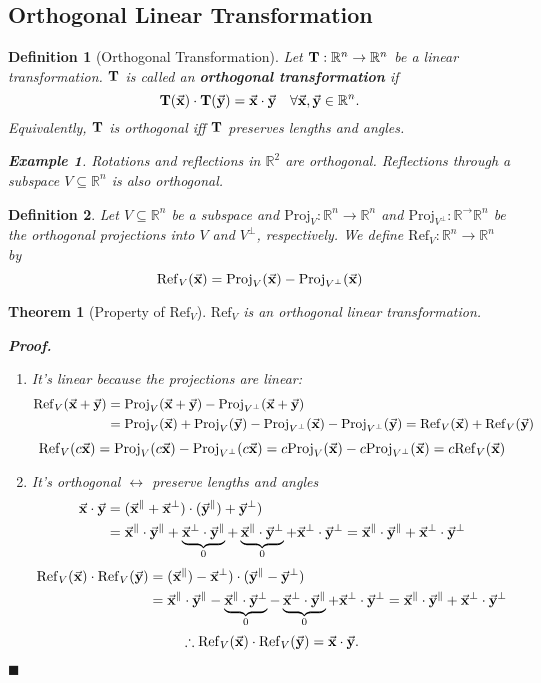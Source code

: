 \documentclass[12pt, a4paper]{article}
\newtheorem{thm}{Theorem}[subsection]
\newtheorem{df}{Definition}[subsection]
\newtheorem{eg}{Example}[subsection]
\newenvironment*{prf}{\par\indent\textbf{\textit{Proof. }}}{\hfill $\blacksquare$\par}
\def\R{{\mathbb{R}}}
\def\T{{\vb{T}}}
\def\Proj{\mathrm{Proj}}
\def\Ref{\mathrm{Ref}}
\def\vecx{\va{x}}
\def\vecy{\va{y}}
\begin{document}
\subsection{Orthogonal Linear Transformation}
\begin{df}[Orthogonal Transformation]
	Let $\T:\R^n\to\R^n$ be a linear transformation. $\T$ is called an \textbf{orthogonal transformation} if \[\T(\vecx)\cdot\T(\vecy)=\vecx\cdot\vecy\quad\forall\vecx,\vecy\in\R^n.\]	
	Equivalently, $\T$ is orthogonal \emph{iff} $\T$ preserves lengths and angles. 
	\begin{eg}
		Rotations and reflections in $\R^2$ are orthogonal. Reflections through a subspace $V\subseteq\R^n$ is also orthogonal. 	
	\end{eg}
\end{df}
\begin{df}
	Let $V\subseteq\R^n$ be a subspace and $\Proj_V:\R^n\to\R^n$ and $\Proj_{V^\perp}:\R^\to\R^n$ be the orthogonal projections into $V$ and $V^\perp$, respectively. We define $\Ref_V:\R^n\to\R^n$ by \[\Ref_V(\vecx)=\Proj_V(\vecx)-\Proj_{V^\perp}(\vecx)\]	
\end{df}
\begin{thm}[Property of $\Ref_V$]
	$\Ref_V$ is an orthogonal linear transformation. \\
	\begin{prf}
		\begin{enumerate}
			\item It's linear because the projections are linear: 
			$$\begin{aligned}
				\Ref_V(\vecx+\vecy)&=\Proj_V(\vecx+\vecy)-\Proj_{V^\perp}(\vecx+\vecy)\\
				&=\Proj_V(\vecx)+\Proj_V(\vecy)-\Proj_{V^\perp}(\vecx)-\Proj_{V^\perp}(\vecy)=\Ref_V(\vecx)+\Ref_V(\vecy)
			\end{aligned}$$	
			\[\Ref_V(c\vecx)=\Proj_V(c\vecx)-\Proj_{V^\perp}(c\vecx)=c\Proj_V(\vecx)-c\Proj_{V^\perp}(\vecx)=c\Ref_V(\vecx)\]
			\item It's orthogonal $\longleftrightarrow$ preserve lengths and angles
			$$\begin{aligned}
				\vecx\cdot\vecy&=(\vecx^\parallel+\vecx^\perp)\cdot(\vecy^\parallel)+\vecy^\perp)\\
				&=\vecx^\parallel\cdot\vecy^\parallel+\underbrace{\vecx^\perp\cdot\vecy^\parallel}_{0}+\underbrace{\vecx^\parallel\cdot\vecy^\perp}_{0}+\vecx^\perp\cdot\vecy^\perp=\vecx^\parallel\cdot\vecy^\parallel+\vecx^\perp\cdot\vecy^\perp
			\end{aligned}$$
			$$\begin{aligned}
				\Ref_V(\vecx)\cdot\Ref_V(\vecy)&=(\vecx^\parallel)-\vecx^\perp)\cdot(\vecy^\parallel-\vecy^\perp)\\
				&=\vecx^\parallel\cdot\vecy^\parallel-\underbrace{\vecx^\parallel\cdot\vecy^\perp}_{0}-\underbrace{\vecx^\perp\cdot\vecy^\parallel}_{0}+\vecx^\perp\cdot\vecy^\perp=\vecx^\parallel\cdot\vecy^\parallel+\vecx^\perp\cdot\vecy^\perp
			\end{aligned}$$
			\[\therefore\Ref_V(\vecx)\cdot\Ref_V(\vecy)=\vecx\cdot\vecy.\]
		\end{enumerate}
	\end{prf}
\end{thm}
\end{document}
